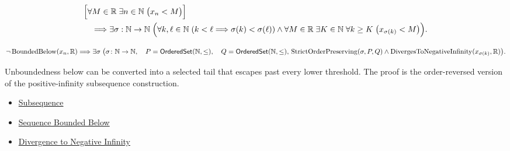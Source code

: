 \begin{remark*}
\[
\begin{aligned}
&\Bigl[
  \forall M\in\mathbb{R}\;\exists n\in\mathbb{N}\;\bigl(x_n<M\bigr)
\Bigr]\\
&\quad\Longrightarrow
\exists \sigma:\mathbb{N}\to\mathbb{N}\;
\Bigl(
  \forall k,\ell\in\mathbb{N}\;(k<\ell\Longrightarrow \sigma(k)<\sigma(\ell))
  \land
  \forall M\in\mathbb{R}\;\exists K\in\mathbb{N}\;\forall k\ge K
  \;\bigl(x_{\sigma(k)}<M\bigr)
\Bigr).
\end{aligned}
\]
\end{remark*}

\begin{remark*}
\[
\neg\operatorname{BoundedBelow}(x_n,\mathbb{R})
\Longrightarrow
\exists \sigma\;
\bigl(
  \sigma\colon\mathbb{N}\to\mathbb{N},\quad
  P=\mathsf{OrderedSet}(\mathbb{N},\leq),\quad
  Q=\mathsf{OrderedSet}(\mathbb{N},\leq),\\
  \operatorname{StrictOrderPreserving}(\sigma,P,Q)
  \land
  \operatorname{DivergesToNegativeInfinity}(x_{\sigma(k)},\mathbb{R})
\bigr).
\]
\end{remark*}

\begin{remark*}[Interpretation]
Unboundedness below can be converted into a selected tail that escapes past
every lower threshold. The proof is the order-reversed version of the
positive-infinity subsequence construction.
\end{remark*}

\begin{dependencies}
\begin{itemize}
  \item \hyperref[def:subsequence-of-sequence]{Subsequence}
  \item \hyperref[def:sequence-bounded-below]{Sequence Bounded Below}
  \item \hyperref[def:diverges-to-negative-infinity]{Divergence to Negative Infinity}
\end{itemize}
\end{dependencies}


